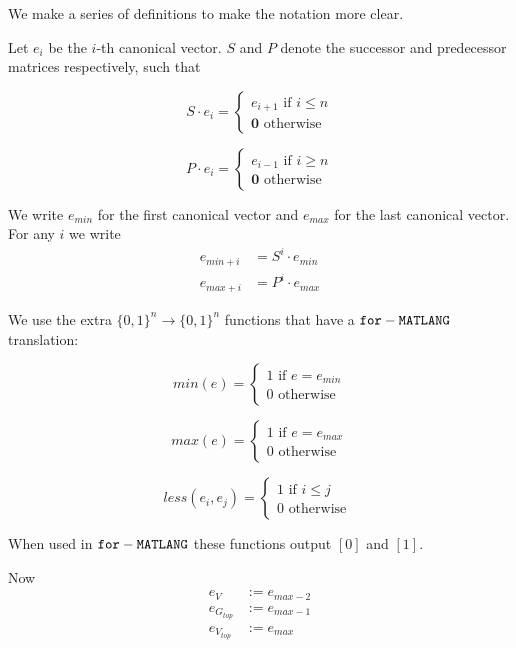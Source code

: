 We make a series of definitions to make the notation more clear.

Let $e_i$ be the $i$-th canonical vector. $S$ and $P$ denote the successor and predecessor matrices respectively, such that

\[
  			S\cdot e_i=\begin{cases}
               e_{i+1} \text{ if } i\leq n \\
               \mathbf{0} \text{ otherwise }
            \end{cases}
\]

\[
  			P\cdot e_i=\begin{cases}
               e_{i-1} \text{ if } i\geq n \\
               \mathbf{0} \text{ otherwise }
            \end{cases}
\]

We write $e_{min}$ for the first canonical vector and $e_{max}$ for the last canonical vector. For any $i$ we write 
\begin{align*}
	e_{min+i} &= S^i\cdot e_{min} \\
	e_{max+i} &= P^i\cdot e_{max}
\end{align*}

We use the extra $\lbrace 0,1 \rbrace^n\rightarrow\lbrace 0,1 \rbrace^n$ functions that have a $\texttt{for}-\texttt{MATLANG}$ translation:

\[
  			min(e)=\begin{cases}
               1 \text{ if } e=e_{min} \\
               0 \text{ otherwise }
             \end{cases}
\]

\[
  			max(e)=\begin{cases}
               1 \text{ if } e=e_{max} \\
               0 \text{ otherwise }
             \end{cases}
\]

\[
  			less(e_i,e_j)=\begin{cases}
               1 \text{ if } i\leq j \\
               0 \text{ otherwise }
             \end{cases}
\]

When used in $\texttt{for}-\texttt{MATLANG}$ these functions output $[0]$ and $[1]$.

Now 
\begin{align*}
	e_{V}&:=e_{max-2} \\
	e_{G_{top}}&:=e_{max-1} \\
	e_{V_{top}}&:=e_{max}
\end{align*}

